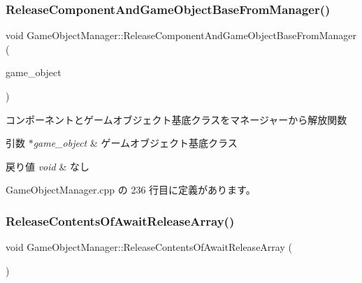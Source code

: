 \subsubsection{\texorpdfstring{Release\+Component\+And\+Game\+Object\+Base\+From\+Manager()}{ReleaseComponentAndGameObjectBaseFromManager()}}
{\footnotesize\ttfamily void Game\+Object\+Manager\+::\+Release\+Component\+And\+Game\+Object\+Base\+From\+Manager (\begin{DoxyParamCaption}\item[{\mbox{\hyperlink{class_game_object_base}{Game\+Object\+Base}} $\ast$}]{game\+\_\+object }\end{DoxyParamCaption})\hspace{0.3cm}{\ttfamily [private]}}



コンポーネントとゲームオブジェクト基底クラスをマネージャーから解放関数 


\begin{DoxyParams}{引数}
{\em $\ast$game\+\_\+object} & ゲームオブジェクト基底クラス \\
\hline
\end{DoxyParams}

\begin{DoxyRetVals}{戻り値}
{\em void} & なし \\
\hline
\end{DoxyRetVals}


 Game\+Object\+Manager.\+cpp の 236 行目に定義があります。

\mbox{\label{class_game_object_manager_a5a6c1208229decd93c6ef396bce35b3a}} 
\subsubsection{\texorpdfstring{Release\+Contents\+Of\+Await\+Release\+Array()}{ReleaseContentsOfAwaitReleaseArray()}}
{\footnotesize\ttfamily void Game\+Object\+Manager\+::\+Release\+Contents\+Of\+Await\+Release\+Array (\begin{DoxyParamCaption}{ }\end{DoxyParamCaption})\hspace{0.3cm}{\ttfamily [private]}}



